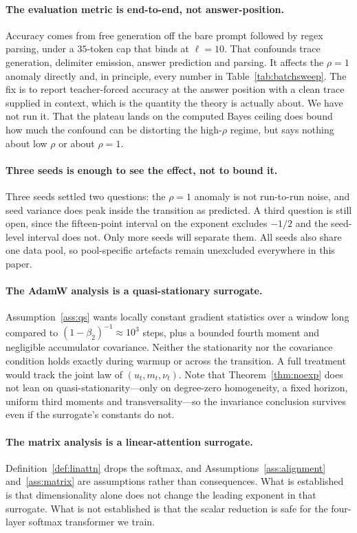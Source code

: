 \documentclass{article}
\theoremstyle{plain}
\theoremstyle{definition}
\theoremstyle{remark}
\newcommand{\1}{\mathbf{1}}
\begin{document}
\paragraph{The evaluation metric is end-to-end, not answer-position.}
Accuracy comes from free generation off the bare prompt followed by regex
parsing, under a $35$-token cap that binds at $\ell=10$. That confounds trace
generation, delimiter emission, answer prediction and parsing. It affects the
$\rho=1$ anomaly directly and, in principle, every number in
Table~\ref{tab:batchsweep}. The fix is to report teacher-forced accuracy at the
answer position with a clean trace supplied in context, which is the quantity the
theory is actually about. We have not run it. That the plateau lands on the
computed Bayes ceiling does bound how much the confound can be distorting the
high-$\rho$ regime, but says nothing about low $\rho$ or about $\rho=1$.

\paragraph{Three seeds is enough to see the effect, not to bound it.}
Three seeds settled two questions: the $\rho=1$ anomaly is not run-to-run noise,
and seed variance does peak inside the transition as predicted. A third question
is still open, since the fifteen-point interval on the exponent excludes $-1/2$
and the seed-level interval does not. Only more seeds will separate them. All
seeds also share one data pool, so pool-specific artefacts remain unexcluded
everywhere in this paper.

\paragraph{The AdamW analysis is a quasi-stationary surrogate.}
Assumption~\ref{ass:qs} wants locally constant gradient statistics over a window
long compared to $(1-\beta_2)^{-1}\approx10^3$ steps, plus a bounded fourth
moment and negligible accumulator covariance. Neither the stationarity nor the
covariance condition holds exactly during warmup or across the transition. A full
treatment would track the joint law of $(u_t,m_t,\nu_t)$. Note that
Theorem~\ref{thm:noexp} does not lean on quasi-stationarity---only on degree-zero
homogeneity, a fixed horizon, uniform third moments and transversality---so the
invariance conclusion survives even if the surrogate's constants do not.

\paragraph{The matrix analysis is a linear-attention surrogate.}
Definition~\ref{def:linattn} drops the softmax, and
Assumptions~\ref{ass:alignment} and~\ref{ass:matrix} are assumptions rather than
consequences. What is established is that dimensionality alone does not change
the leading exponent in that surrogate. What is not established is that the
scalar reduction is safe for the four-layer softmax transformer we train.
\end{document}
